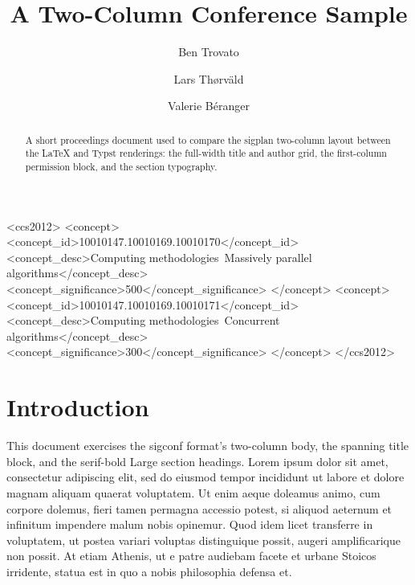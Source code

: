 \documentclass[sigplan]{acmart}
\begin{document}
\title{A Two-Column Conference Sample}

\author{Ben Trovato}

\author{Lars Th{\o}rv{\"a}ld}

\author{Valerie B\'eranger}

\begin{abstract}
  A short proceedings document used to compare the sigplan two-column layout
  between the LaTeX and Typst renderings: the full-width title and author grid,
  the first-column permission block, and the section typography.
\end{abstract}

\begin{CCSXML}
<ccs2012>
 <concept>
  <concept_id>10010147.10010169.10010170</concept_id>
  <concept_desc>Computing methodologies~Massively parallel algorithms</concept_desc>
  <concept_significance>500</concept_significance>
 </concept>
 <concept>
  <concept_id>10010147.10010169.10010171</concept_id>
  <concept_desc>Computing methodologies~Concurrent algorithms</concept_desc>
  <concept_significance>300</concept_significance>
 </concept>
</ccs2012>
\end{CCSXML}



\maketitle

\section{Introduction}
This document exercises the sigconf format's two-column body, the spanning title
block, and the serif-bold Large section headings. Lorem ipsum dolor sit amet,
consectetur adipiscing elit, sed do eiusmod tempor incididunt ut labore et dolore
magnam aliquam quaerat voluptatem. Ut enim aeque doleamus animo, cum corpore
dolemus, fieri tamen permagna accessio potest, si aliquod aeternum et infinitum
impendere malum nobis opinemur. Quod idem licet transferre in voluptatem, ut
postea variari voluptas distinguique possit, augeri amplificarique non possit. At
etiam Athenis, ut e patre audiebam facete et urbane Stoicos irridente, statua est
in quo a nobis philosophia defensa et.
\end{document}
